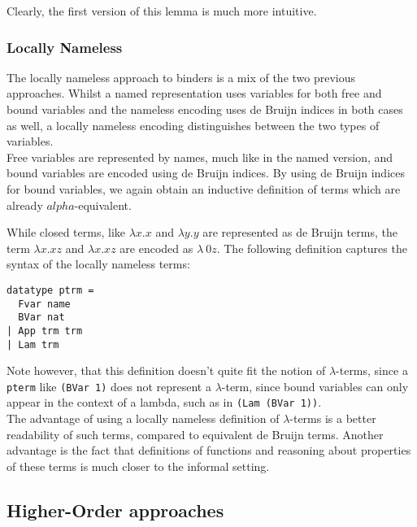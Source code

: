 \documentclass[a4paper, 12pt, twoside]{style/ociamthesis}
\theoremstyle{plain}
\theoremstyle{definition}
\theoremstyle{remark}
\begin{document}
Clearly, the first version of this lemma is much more intuitive.

\subsubsection{Locally Nameless}\label{locally-nameless}

The locally nameless approach to binders is a mix of the two previous
approaches. Whilst a named representation uses variables for both free
and bound variables and the nameless encoding uses de Bruijn indices in
both cases as well, a locally nameless encoding distinguishes between
the two types of variables.\\
Free variables are represented by names, much like in the named version,
and bound variables are encoded using de Bruijn indices. By using de
Bruijn indices for bound variables, we again obtain an inductive
definition of terms which are already \(alpha\)-equivalent.

While closed terms, like \(\lambda x.x\) and \(\lambda y.y\) are
represented as de Bruijn terms, the term \(\lambda x.xz\) and
\(\lambda x.xz\) are encoded as \(\lambda\ 0z\). The following
definition captures the syntax of the locally nameless terms:

\begin{verbatim}
datatype ptrm =
  Fvar name
  BVar nat
| App trm trm
| Lam trm
\end{verbatim}

Note however, that this definition doesn't quite fit the notion of
\(\lambda\)-terms, since a \texttt{pterm} like \texttt{(BVar 1)} does
not represent a \(\lambda\)-term, since bound variables can only appear
in the context of a lambda, such as in \texttt{(Lam (BVar 1))}.\\
The advantage of using a locally nameless definition of
\(\lambda\)-terms is a better readability of such terms, compared to
equivalent de Bruijn terms. Another advantage is the fact that
definitions of functions and reasoning about properties of these terms
is much closer to the informal setting.

\subsection{Higher-Order approaches}\label{higher-order-approaches}
\end{document}
